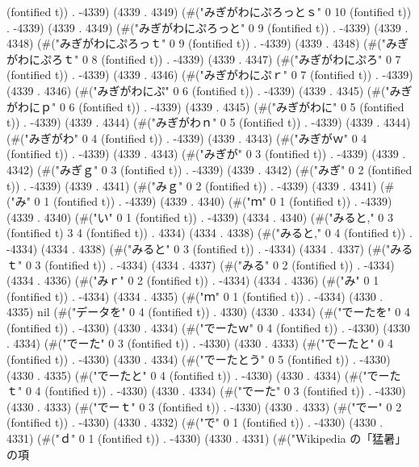 (fontified t)) . -4339) (4339 . 4349) (#("みぎがわにぷろっとｓ" 0 10 (fontified t)) . -4339) (4339 . 4349) (#("みぎがわにぷろっと" 0 9 (fontified t)) . -4339) (4339 . 4348) (#("みぎがわにぷろっｔ" 0 9 (fontified t)) . -4339) (4339 . 4348) (#("みぎがわにぷろｔ" 0 8 (fontified t)) . -4339) (4339 . 4347) (#("みぎがわにぷろ" 0 7 (fontified t)) . -4339) (4339 . 4346) (#("みぎがわにぷｒ" 0 7 (fontified t)) . -4339) (4339 . 4346) (#("みぎがわにぷ" 0 6 (fontified t)) . -4339) (4339 . 4345) (#("みぎがわにｐ" 0 6 (fontified t)) . -4339) (4339 . 4345) (#("みぎがわに" 0 5 (fontified t)) . -4339) (4339 . 4344) (#("みぎがわｎ" 0 5 (fontified t)) . -4339) (4339 . 4344) (#("みぎがわ" 0 4 (fontified t)) . -4339) (4339 . 4343) (#("みぎがｗ" 0 4 (fontified t)) . -4339) (4339 . 4343) (#("みぎが" 0 3 (fontified t)) . -4339) (4339 . 4342) (#("みぎｇ" 0 3 (fontified t)) . -4339) (4339 . 4342) (#("みぎ" 0 2 (fontified t)) . -4339) (4339 . 4341) (#("みｇ" 0 2 (fontified t)) . -4339) (4339 . 4341) (#("み" 0 1 (fontified t)) . -4339) (4339 . 4340) (#("ｍ" 0 1 (fontified t)) . -4339) (4339 . 4340) (#("い" 0 1 (fontified t)) . -4339) (4334 . 4340) (#("みると," 0 3 (fontified t) 3 4 (fontified t)) . 4334) (4334 . 4338) (#("みると," 0 4 (fontified t)) . -4334) (4334 . 4338) (#("みると" 0 3 (fontified t)) . -4334) (4334 . 4337) (#("みるｔ" 0 3 (fontified t)) . -4334) (4334 . 4337) (#("みる" 0 2 (fontified t)) . -4334) (4334 . 4336) (#("みｒ" 0 2 (fontified t)) . -4334) (4334 . 4336) (#("み" 0 1 (fontified t)) . -4334) (4334 . 4335) (#("ｍ" 0 1 (fontified t)) . -4334) (4330 . 4335) nil (#("データを" 0 4 (fontified t)) . 4330) (4330 . 4334) (#("でーたを" 0 4 (fontified t)) . -4330) (4330 . 4334) (#("でーたｗ" 0 4 (fontified t)) . -4330) (4330 . 4334) (#("でーた" 0 3 (fontified t)) . -4330) (4330 . 4333) (#("でーたと" 0 4 (fontified t)) . -4330) (4330 . 4334) (#("でーたとう" 0 5 (fontified t)) . -4330) (4330 . 4335) (#("でーたと" 0 4 (fontified t)) . -4330) (4330 . 4334) (#("でーたｔ" 0 4 (fontified t)) . -4330) (4330 . 4334) (#("でーた" 0 3 (fontified t)) . -4330) (4330 . 4333) (#("でーｔ" 0 3 (fontified t)) . -4330) (4330 . 4333) (#("でー" 0 2 (fontified t)) . -4330) (4330 . 4332) (#("で" 0 1 (fontified t)) . -4330) (4330 . 4331) (#("ｄ" 0 1 (fontified t)) . -4330) (4330 . 4331) (#("Wikipedia の「猛暑」の項
